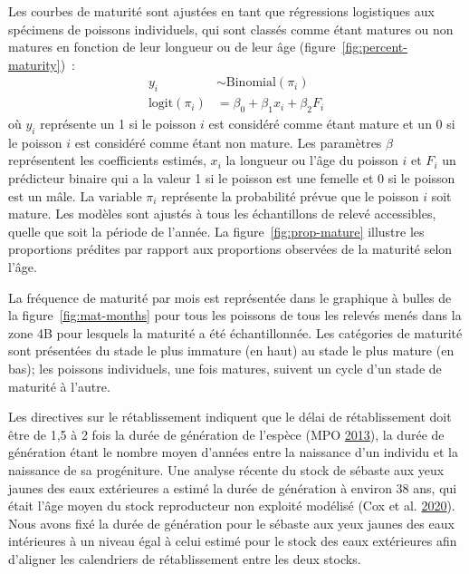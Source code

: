 \documentclass[french,11pt]{book}
\begin{document}
Les courbes de maturité sont ajustées en tant que régressions logistiques aux spécimens de poissons individuels, qui sont classés comme étant matures ou non matures en fonction de leur longueur ou de leur âge (figure~\ref{fig:percent-maturity})~:
\begin{align}
y_i &\sim \mathrm{Binomial}(\pi_i)\\
\mathrm{logit} \left( \pi_i \right) &= \beta_0 + \beta_1 x_i + \beta_2 F_i
\end{align}
où \(y_i\) représente un 1 si le poisson \(i\) est considéré comme étant mature et un 0 si le poisson \(i\) est considéré comme étant non mature. Les paramètres \(\beta\) représentent les coefficients estimés, \(x_i\) la longueur ou l'âge du poisson \(i\) et \(F_i\) un prédicteur binaire qui a la valeur 1 si le poisson est une femelle et 0 si le poisson est un mâle. La variable \(\pi_i\) représente la probabilité prévue que le poisson \(i\) soit mature. Les modèles sont ajustés à tous les échantillons de relevé accessibles, quelle que soit la période de l'année. La figure~\ref{fig:prop-mature} illustre les proportions prédites par rapport aux proportions observées de la maturité selon l'âge.



La fréquence de maturité par mois est représentée dans le graphique à bulles de la figure~\ref{fig:mat-months} pour tous les poissons de tous les relevés menés dans la zone 4B pour lesquels la maturité a été échantillonnée. Les catégories de maturité sont présentées du stade le plus immature (en haut) au stade le plus mature (en bas); les poissons individuels, une fois matures, suivent un cycle d'un stade de maturité à l'autre.

\hypertarget{sec:generation}{%
\label{sec:generation}}

Les directives sur le rétablissement indiquent que le délai de rétablissement doit être de 1,5 à 2 fois la durée de génération de l'espèce (MPO \protect\hyperlink{ref-dfo2013}{2013}), la durée de génération étant le nombre moyen d'années entre la naissance d'un individu et la naissance de sa progéniture. Une analyse récente du stock de sébaste aux yeux jaunes des eaux extérieures a estimé la durée de génération à environ 38 ans, qui était l'âge moyen du stock reproducteur non exploité modélisé (Cox et al. \protect\hyperlink{ref-cox2020}{2020}). Nous avons fixé la durée de génération pour le sébaste aux yeux jaunes des eaux intérieures à un niveau égal à celui estimé pour le stock des eaux extérieures afin d'aligner les calendriers de rétablissement entre les deux stocks.
\end{document}
